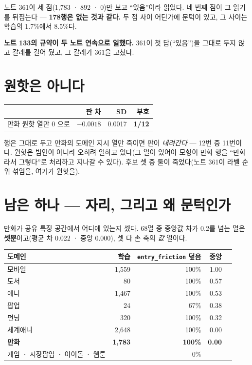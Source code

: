 \documentclass[11pt]{article}
\begin{document}
노트 361이 세 점(1,783 · 892 · 0)만 보고 ``있음''이라 읽었다. 네 번째
점이 그 읽기를 뒤집는다 --- \textbf{178행은 없는 것과 같다.} 두 점 사이
어딘가에 문턱이 있고, 그 사이는 학습의 1.7\%에서 8.5\%다.

\textbf{노트 133의 규약이 두 노트 연속으로 일했다.} 361이 첫 답(``있음'')을
그대로 두지 않고 갈래를 걸어 뒀고, 그 갈래가 361을 고쳤다.

\section{원핫은 아니다}

\begin{center}
\begin{tabular}{lrrr}
\hline
 & 판 차 & SD & 부호 \\
\hline
만화 원핫 열만 0 으로 & $-0.0018$ & 0.0017 & \textbf{1/12} \\
\hline
\end{tabular}
\end{center}

행은 그대로 두고 만화의 도메인 지시 열만 죽이면 판이 \emph{내려간다} ---
12번 중 11번이다. 원핫은 범인이 아니라 오히려 일하고 있다(그 열이 있어야
모형이 만화 행을 ``만화라서 그렇다''로 처리하고 지나갈 수 있다).
후보 셋 중 둘이 죽었다(노트 361이 라벨 순위 섞임을, 여기가 원핫을).

\section{남은 하나 --- 자리, 그리고 왜 문턱인가}

만화가 공유 특징 공간에서 어디에 있는지 셌다. 68열 중 중앙값 차가 0.2를
넘는 열은 \textbf{셋뿐}이고(평균 차 0.022 · 중앙 0.000), 셋 다 손 축의
\emph{값} 열이다.

\begin{center}
\begin{tabular}{lrrrr}
\hline
도메인 & 학습 & \texttt{entry\_friction} 덮음 & 중앙 \\
\hline
모바일   & 1,559 & 100\% & 1.00 \\
도서     &    80 & 100\% & 0.57 \\
애니     & 1,467 & 100\% & 0.53 \\
팝업     &    24 &  67\% & 0.38 \\
펀딩     &   320 & 100\% & 0.32 \\
세계애니 & 2,648 & 100\% & 0.00 \\
\textbf{만화} & \textbf{1,783} & \textbf{100\%} & \textbf{0.00} \\
게임 · 시장팝업 · 아이돌 · 웹툰 & --- & 0\% & --- \\
\hline
\end{tabular}
\end{center}
\end{document}
